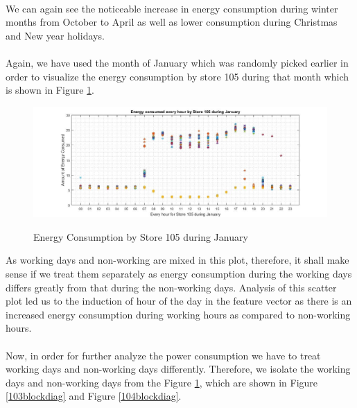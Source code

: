 \documentclass[12pt]{article}
\begin{document}
\paragraph{}We can again see the noticeable increase in  energy consumption during winter months from October to April as well as lower consumption during Christmas and New year holidays. 


\paragraph{}Again, we have used the month of January which was randomly picked earlier in order to visualize the energy consumption by store 105 during that month which is shown in Figure \ref{102blockdiag}.

\begin{figure}[H]
	\centering
	{\includegraphics[scale=0.37]{new_105_jan_alldays.jpg}\label{102blockdiag}
	}
	\caption[The Block Diagram of the designed application]{Energy Consumption by Store 105 during January}
	\label{102blockdiag}
	\hspace{0cm}%
\end{figure}

As working days and non-working are mixed in this plot, therefore, it shall make sense if we treat them separately as energy consumption during the working days differs greatly from that during the non-working days. Analysis of this scatter plot led us to the induction of hour of the day in the feature vector as there is an increased energy consumption during working hours as compared to non-working hours.

\paragraph{} Now, in order for further analyze the power consumption we have to treat working days and non-working days differently. Therefore, we isolate the working days and non-working days from the Figure \ref{102blockdiag}, which are shown in Figure \ref{103blockdiag} and Figure \ref{104blockdiag}. 
\end{document}
